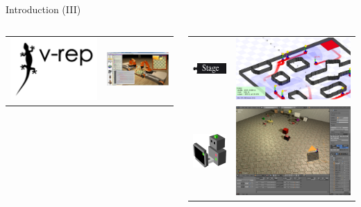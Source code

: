 \documentclass[10pt,compress]{beamer} %
\begin{document}
\begin{frame}{Introduction (III)}
\begin{columns}
\begin{tabular}{cc}
            \includegraphics[width=0.3\linewidth]{figs/vrep.png}&
            \includegraphics[width=0.6\linewidth]{figs/vrepScreen.png} \\
        \end{tabular}
        \begin{tabular}{cc}
            \includegraphics[width=0.3\linewidth]{figs/stage.png}&
            \includegraphics[width=0.6\linewidth]{figs/stageScreen.png} \\
            \includegraphics[width=0.2\linewidth]{figs/morse-logo.png}&
            \includegraphics[width=0.6\linewidth]{figs/morseScreen.png} \\

\end{tabular}
\end{columns}
\end{frame}
\end{document}
